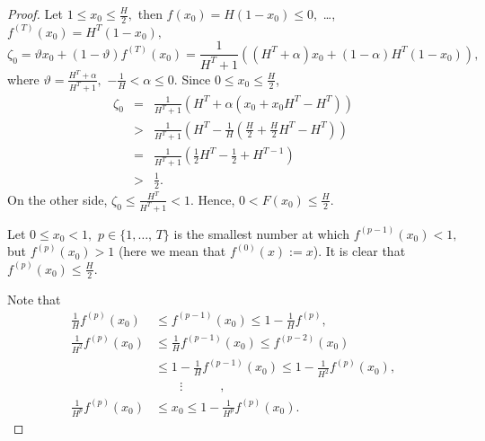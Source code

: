 \documentclass[12pt,a4paper]{amsart}
\makeatletter
\newcommand{\leqnomode}{\tagsleft@true}
\makeatother
\begin{document}
\begin{proof}
Let $1\leq x_0 \leq \frac{H}{2},$ then $f(x_0)=H(1-x_0)\leq 0,$ \ldots, $f^{(T)}(x_0)=H^T (1-x_0),$
$$
\zeta_0=\vartheta x_0 + (1-\vartheta)f^{(T)}(x_0)=\frac{1}{H^T + 1} \left ( (H^T+\alpha)x_0 + (1-\alpha)H^T(1-x_0)\right),
$$
where $\vartheta=\frac{H^T+\alpha}{H^T+1},$ $-\frac{1}{H} < \alpha \leq 0.$ Since $0\leq x_0 \leq \frac{H}{2}$,
\begin{eqnarray*}
\zeta_0 &=& \frac{1}{H^T+1} \left( H^T + \alpha(x_0 + x_0 H^T - H^T)\right) \\
&>& \frac{1}{H^T+1} \left( H^T - \frac{1}{H} \left(\frac{H}{2} + \frac{H}{2} H^T - H^T\right)\right) \\
&=& \frac{1}{H^T+1} \left( \frac12 H^T - \frac12 + H^{T-1} \right) \\ 
&>& \frac12.
\end{eqnarray*}
On the other side, $\zeta_0 \leq \frac{H^T}{H^T+1} < 1.$ Hence, $0 < F(x_0)\leq \frac{H}{2}.$

Let $0 \leq x_0 < 1,$ $p\in \{1,\ldots,\,T\}$ is the smallest number at which $f^{(p-1)}(x_0) < 1,$ but $f^{(p)}(x_0)>1$
(here we mean that $f^{(0)}(x):=x$). It is clear that $f^{(p)}(x_0) \leq \frac{H}{2}.$

Note that
\leqnomode
\begin{align}\label{mis9}
\frac{1}{H} f^{(p)}(x_0) &\leq f^{(p-1)}(x_0) \leq 1 - \frac{1}{H} f^{(p)}, \nonumber \\
\frac{1}{H^2} f^{(p)}(x_0) &\leq \frac{1}{H} f^{(p-1)}(x_0) \leq f^{(p-2)}(x_0) \nonumber \\
&\leq  1-\frac{1}{H} f^{(p-1)}(x_0) \leq 
1 - \frac{1}{H^2} f^{(p)}(x_0), \\
\quad \quad \quad & \quad \quad \vdots\quad \quad \quad , \nonumber \\
\frac{1}{H^p} f^{(p)}(x_0) &\leq x_0 \leq 1 - \frac{1}{H^p} f^{(p)}(x_0) .
\nonumber
\end{align}


\end{proof}
\end{document}
